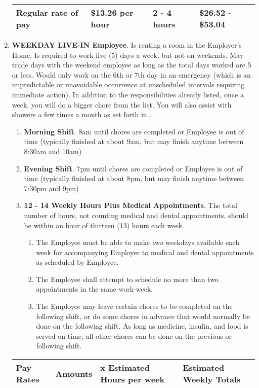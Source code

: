 \documentclass[]{article}
\newcommand{\sw}{.15\textwidth}
\newcommand{\bw}{.39\textwidth}
\newcommand{\weekday}{WEEKDAY LIVE-IN Employee}
\begin{document}
\begin{enumerate}
\begin{tabular}{|p{\bw}|p{\sw}|p{\sw}|p{\sw}|}
			Regular rate of pay & \$13.26 per hour & 2 - 4 hours & \$26.52 - \$53.04\\ 
			\hline
		\end{tabular}
	\item \textbf{\weekday{}}. \label{weekday}
		Is renting a room in the Employer's Home. Is required to work five (5) days a week, but not on weekends. May trade days with the weekend employee as long as the total days worked are 5 or less. Would only work on the 6th or 7th day in an emergency (which is an unpredictable or unavoidable occurrence at unscheduled intervals requiring immediate action). In addition to the responsibilities already listed, once a week, you will do a bigger chore from the \bigchores{} list. You will also assist with showers a few times a month as set forth in \shower{}. 
		\begin{enumerate}
			\item \textbf{Morning Shift}. 8am until chores are completed or Employee is out of time (typically finished at about 9am, but may finish anytime between 8:30am and 10am)
			\item \textbf{Evening Shift}. 7pm until chores are completed or Employee is out of time (typically finished at about 8pm, but may finish anytime between 7:30pm and 9pm)
			\item \textbf{12 - 14 Weekly Hours Plus Medical Appointments}. The total number of hours, not counting medical and dental appointments, should be within an hour of thirteen (13) hours each week. 
				\begin{enumerate}
					\item The Employee must be able to make two weekdays available each week for accompanying Employer to medical and dental appointments as scheduled by Employee.
					\item The Employee shall attempt to schedule no more than two appointments in the same work-week.
					\item The Employee may leave certain chores to be completed on the following shift, or do some chores in advance that would normally be done on the following shift. As long as medicine, insulin, and food is served on time, all other chores can be done on the previous or following shift.
				\end{enumerate}
		\end{enumerate}
		\begin{tabular}{|p{\bw}|p{\sw}|p{\sw}|p{\sw}|}
			\hline
			\rowcolor{medgray}
			Pay Rates & Amounts & x Estimated Hours per week & Estimated Weekly Totals\\ \hline

\end{tabular}
\end{enumerate}
\end{document}
